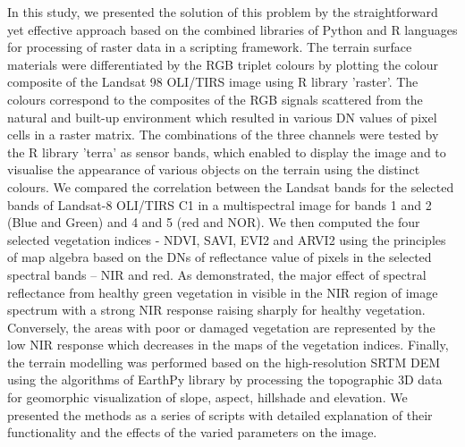 \documentclass[ijgi,article,submit,pdftex,moreauthors]{Definitions/mdpi}
\begin{document}
In this study, we presented the solution of this problem by the straightforward yet effective approach based on the combined libraries of Python and R languages for processing of raster data in a scripting framework. The terrain surface materials were differentiated by the RGB triplet colours by plotting the colour composite of the Landsat 98 OLI/TIRS image using R library 'raster'. The colours correspond to the composites of the RGB signals scattered from the natural and built-up environment which resulted in various DN values of pixel cells in a raster matrix. The combinations of the three channels were tested by the R library 'terra' as sensor bands, which enabled to display the image and to visualise the appearance of various objects on the terrain using the distinct colours. We compared the correlation between the Landsat bands for the selected bands of Landsat-8 OLI/TIRS C1 in a multispectral image for bands 1 and 2 (Blue and Green) and 4 and 5 (red and NOR). We then computed the four selected vegetation indices - NDVI, SAVI, EVI2 and ARVI2 using the principles of map algebra based on the DNs of reflectance value of pixels in the selected spectral bands -- NIR and red. As demonstrated, the major effect of spectral reflectance from healthy green vegetation in visible in the NIR region of image spectrum with a strong NIR response raising sharply for healthy vegetation. Conversely, the areas with poor or damaged vegetation are represented by the low NIR response which decreases in the maps of the vegetation indices. Finally, the terrain modelling was performed based on the high-resolution SRTM DEM using the algorithms of EarthPy library by processing the topographic 3D data for geomorphic visualization of slope, aspect, hillshade and elevation. We presented the methods as a series of scripts with detailed explanation of their functionality and the effects of the varied parameters on the image. 
\end{document}
